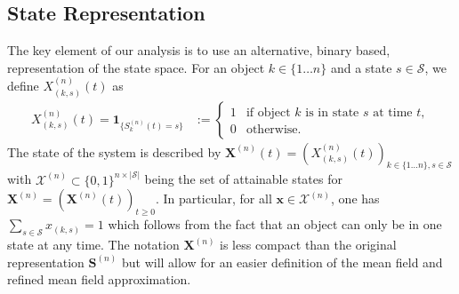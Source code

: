 \documentclass[acmsmall]{acmart}
\newcommand\bx{\mathbf{x}}
\newcommand\bS{\mathbf{S}}
\newcommand\bX{\mathbf{X}}
\newcommand\calX{\mathcal{X}}
\newcommand\calS{\mathcal{S}}
\newcommand\toN{^{(n)}}
\newcommand\bSn{\bS\toN}
\newcommand\bXn{\bX\toN}
\newcommand\Xn{X\toN}
\newcommand\ns{n\times|\calS|} %
\newcommand\ind[1]{\mathbf{1}_{\{#1\}}} %
\begin{document}

\subsection{State Representation}
\label{ssec:state_representation}
The key element of our analysis is to use an alternative, binary based, representation of the state space. For an object $k\in\{1\hdots n\}$ and a state $s\in\calS$, we define $\Xn_{(k,s)}(t)$ as
\begin{align*}
  \Xn_{(k,s)}(t) = \ind{S_k\toN(t)=s} &:=\left\{\begin{array}{ll}
    1 &\text{if object $k$ is in state $s$ at time $t$}, \\
    0 &\text{otherwise.}
  \end{array}\right.
\end{align*}
The state of the system is described by $\bXn(t)=(\Xn_{(k,s)}(t))_{k\in\{1\hdots n\},s\in\calS}$ with $\calX\toN\subset\{0,1\}^{\ns}$ being the set of attainable states for $\bXn=(\bXn(t))_{t\geq0}$. In particular, for all $\bx\in\calX\toN$, one has $\sum_{s\in\calS} x_{(k,s)} = 1$ which follows from the fact that an object can only be in one state at any time. The notation $\bXn$ is less compact than the original representation $\bSn$ but will allow for an easier definition of the mean field and refined mean field approximation. 
\end{document}
